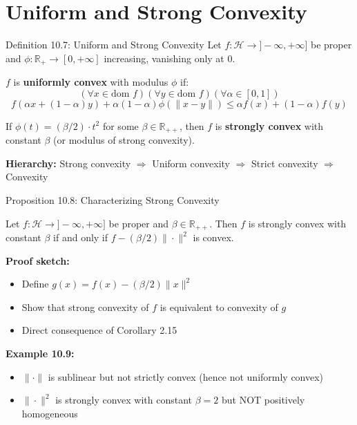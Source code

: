 \documentclass[aspectratio=169,10pt]{beamer}
\begin{document}
\section{Uniform and Strong Convexity}

\begin{frame}{Definition 10.7: Uniform and Strong Convexity}
Let $f: \mathcal{H} \to ]-\infty, +\infty]$ be proper and $\phi: \mathbb{R}_+ \to [0, +\infty]$ increasing, vanishing only at 0.

\begin{definition}
$f$ is \textbf{uniformly convex} with modulus $\phi$ if:
\[
(\forall x \in \text{dom } f)(\forall y \in \text{dom } f)(\forall \alpha \in [0,1])
\]
\[
f(\alpha x + (1-\alpha)y) + \alpha(1-\alpha)\phi(\|x-y\|) \leq \alpha f(x) + (1-\alpha)f(y)
\]
\end{definition}

\begin{definition}
If $\phi(t) = (\beta/2) \cdot t^2$ for some $\beta \in \mathbb{R}_{++}$, then $f$ is \textbf{strongly convex} with constant $\beta$ (or modulus of strong convexity).
\end{definition}

\textbf{Hierarchy:} Strong convexity $\Rightarrow$ Uniform convexity $\Rightarrow$ Strict convexity $\Rightarrow$ Convexity
\end{frame}

\begin{frame}{Proposition 10.8: Characterizing Strong Convexity}
\begin{proposition}
Let $f: \mathcal{H} \to ]-\infty, +\infty]$ be proper and $\beta \in \mathbb{R}_{++}$. Then $f$ is strongly convex with constant $\beta$ if and only if $f - (\beta/2)\|\cdot\|^2$ is convex.
\end{proposition}

\textbf{Proof sketch:}
\begin{itemize}
\item Define $g(x) = f(x) - (\beta/2)\|x\|^2$
\item Show that strong convexity of $f$ is equivalent to convexity of $g$
\item Direct consequence of Corollary 2.15
\end{itemize}

\textbf{Example 10.9:}
\begin{itemize}
\item $\|\cdot\|$ is sublinear but not strictly convex (hence not uniformly convex)
\item $\|\cdot\|^2$ is strongly convex with constant $\beta = 2$ but NOT positively homogeneous
\end{itemize}
\end{frame}
\end{document}
